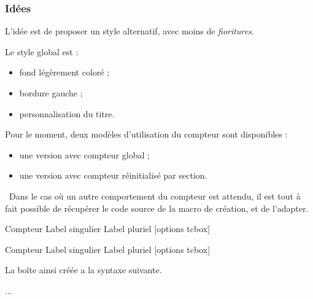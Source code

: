 \documentclass[french,11pt,a4paper]{article}
\begin{document}
\subsubsection{Idées}

L'idée est de proposer un style alternatif, avec moins de \textit{fioritures}.

Le style global est :

\begin{itemize}
	\item fond légèrement coloré ;
	\item bordure gauche ;
	\item personnalisation du titre.
\end{itemize}

Pour le moment, deux modèles d'utilisation du compteur sont disponibles :

\begin{itemize}
	\item une version avec compteur global ;
	\item une version avec compteur réinitialisé par section.
\end{itemize}

{\footnotesize \faBomb}~Dans le cas où un autre comportement du compteur est attendu, il est tout à fait possible de récupérer le code source de la macro de création, et de l'adapter.

\begin{codehigh}[language=latex/latex2,style/main=cyan!10,style/code=cyan!10]
%
  {Compteur}%
  {Label singulier}
  {Label pluriel}
  [options tcbox]

%
  {Compteur}%
  {Label singulier}
  {Label pluriel}
  [options tcbox]
\end{codehigh}

La boîte ainsi créée a la syntaxe suivante.

\begin{codehigh}[language=latex/latex2,style/main=cyan!10,style/code=cyan!10]
\begin{monenvt}[clés]
...
\end{monenvt}

\end{codehigh}
\end{document}
